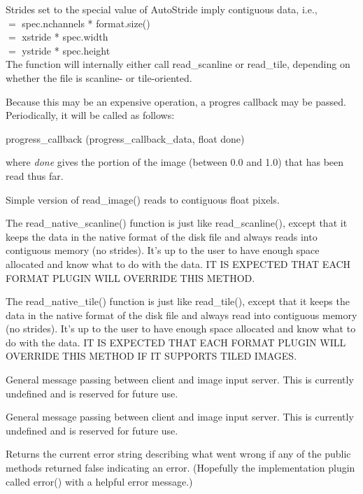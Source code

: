 Strides set to the special value of {\kw AutoStride} imply contiguous
data, i.e., \\
 $=$ {\kw spec.nchannels * format.size()} \\
 $=$ {\kw xstride * spec.width} \\
 $=$ {\kw ystride * spec.height} \\
The function will internally either call {\kw read_scanline} or 
{\kw read_tile}, depending on whether the file is scanline- or
tile-oriented.

Because this may be an expensive operation, a progres callback may be passed.
Periodically, it will be called as follows:\\
\begin{code}
    progress_callback (progress_callback_data, float done)
\end{code}
\noindent where \emph{done} gives the portion of the image 
(between 0.0 and 1.0) that has been read thus far.
\apiend

Simple version of {\kw read_image()} reads to contiguous float pixels.
\apiend

The {\kw read_native_scanline()} function is just like {\kw
  read_scanline()}, except that it keeps the data in the native format
of the disk file and always reads into contiguous memory (no strides).
It's up to the user to have enough space allocated and know what to do
with the data.  IT IS EXPECTED THAT EACH FORMAT PLUGIN WILL OVERRIDE
THIS METHOD.
\apiend

The {\kw read_native_tile()} function is just like {\kw read_tile()}, 
except that it keeps the data in the native format of the disk file and
always read into contiguous memory (no strides).  It's up to the user to
have enough space allocated and know what to do with the data.  IT IS
EXPECTED THAT EACH FORMAT PLUGIN WILL OVERRIDE THIS METHOD IF IT
SUPPORTS TILED IMAGES.
\apiend

General message passing between client and image input server.
This is currently undefined and is reserved for future use.
\apiend

General message passing between client and image input server.
This is currently undefined and is reserved for future use.
\apiend

Returns the current error string describing what went wrong if
any of the public methods returned {\kw false} indicating an error.
(Hopefully the implementation plugin called {\kw error()} with a
helpful error message.)
\apiend




\chapwidthend
